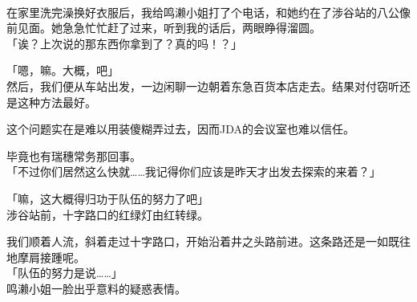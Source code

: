 \sqsplit\\

在家里洗完澡换好衣服后，我给鸣濑小姐打了个电话，和她约在了涉谷站的八公像前见面。她急急忙忙赶了过来，听到我的话后，两眼睁得溜圆。\\

「诶？上次说的那东西你拿到了？真的吗！？」

「嗯，嘛。大概，吧」\\

然后，我们便从车站出发，一边闲聊一边朝着东急百货本店走去。结果对付窃听还是这种方法最好。

这个问题实在是难以用装傻糊弄过去，因而JDA的会议室也难以信任。

毕竟也有瑞穗常务那回事。\\

「不过你们居然这么快就……我记得你们应该是昨天才出发去探索的来着？」

「嘛，这大概得归功于队伍的努力了吧」\\

涉谷站前，十字路口的红绿灯由红转绿。

我们顺着人流，斜着走过十字路口，开始沿着井之头路前进。这条路还是一如既往地摩肩接踵呢。\\

「队伍的努力是说……」\\

鸣濑小姐一脸出乎意料的疑惑表情。\\


